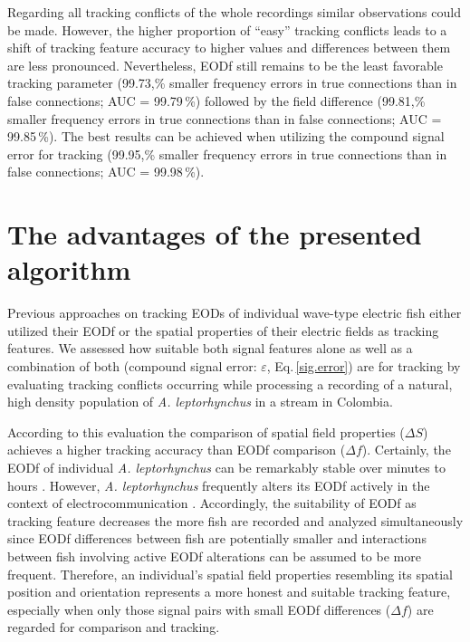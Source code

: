 \documentclass[11pt,pdftex]{article}
\newcommand{\eqnref}[1]{Eq.\,\ref{#1}}
\newcommand{\lepto}{\textit{A. leptorhynchus}}
\begin{document}
Regarding all tracking conflicts of the whole recordings similar observations could be made. However, the higher proportion of ``easy'' tracking conflicts leads to a shift of tracking feature accuracy to higher values and differences between them are less pronounced. Nevertheless, EODf still remains to be the least favorable tracking parameter (99.73,\% smaller frequency errors in true connections than in false connections; AUC = 99.79\,\%) followed by the field difference (99.81,\% smaller frequency errors in true connections than in false connections; AUC = 99.85\,\%). The best results can be achieved when utilizing the compound signal error for tracking (99.95,\% smaller frequency errors in true connections than in false connections; AUC = 99.98\,\%).


\section{The advantages of the presented algorithm}

Previous approaches on tracking EODs of individual wave-type electric fish either utilized their EODf \citep{Henninger2020} or the spatial properties of their electric fields \citep{Madhav2018} as tracking features. We assessed how suitable both signal features alone  as well as a combination of both (compound signal error: $\varepsilon$, \eqnref{sig.error}) are for tracking by evaluating tracking conflicts occurring while processing a recording of a natural, high density population of \lepto{} in a stream in Colombia. 

According to this evaluation the comparison of spatial field properties ($\Delta S$) achieves a higher tracking accuracy than EODf comparison ($\Delta f$). Certainly, the EODf of individual \lepto{} can be remarkably stable over minutes to hours \citep{Moortgat1998}. However, \lepto{} frequently alters its EODf actively in the context of electrocommunication \citep{Smith2013}. Accordingly, the suitability of EODf as tracking feature decreases the more fish are recorded and analyzed simultaneously since EODf differences between fish are potentially smaller and interactions between fish involving active EODf alterations can be assumed to be more frequent. Therefore, an individual's spatial field properties resembling its spatial position and orientation represents a more honest and suitable tracking feature, especially when only those signal pairs with small EODf differences ($\Delta f$) are regarded for comparison and tracking.
\end{document}

